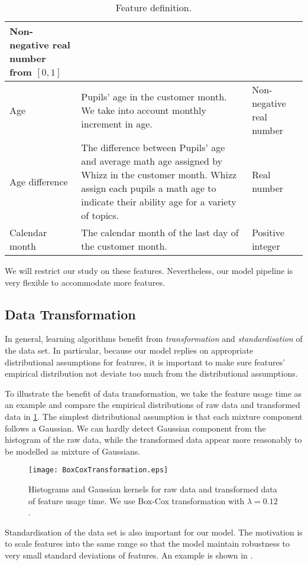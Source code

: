 \begin{table}[!h]
\begin{tabular}{p{3cm}|p{7cm}|p{3.3cm}}
Non-negative real number from $[0,1]$ \\
\hline
Age &
Pupils' age in the customer month. We take into account monthly increment in age.&
Non-negative real number \\
\hline
Age difference &
The difference between Pupils' age and average math age assigned by Whizz in the customer month. Whizz assign each pupils a math age to indicate their ability age for a variety of topics.&
Real number \\
\hline
Calendar month &
The calendar month of the last day of the customer month. &
Positive integer \\
\hline
\end{tabular}
\caption{Feature definition.}
\label{tab:featureDefinition}
\end{table}

We will restrict our study on these features. Nevertheless, our model pipeline is very flexible to accommodate more features. 

\subsection{Data Transformation}

In general, learning algorithms benefit from \textit{transformation} and \textit{standardisation} of the data set. In particular, because our model replies on appropriate distributional assumptions for features, it is important to make sure features' empirical distribution not deviate too much from the distributional assumptions.

To illustrate the benefit of data transformation, we take the feature usage time as an example and compare the empirical distributions of raw data and transformed data in \ref{fig:boxcox}. The simplest distributional assumption is that each mixture component follows a Gaussian. We can hardly detect Gaussian component from the histogram of the raw data, while the transformed data appear more reasonably to be modelled as mixture of Gaussians. 

\begin{figure}[!h]
\centering
\texttt{[image: BoxCoxTransformation.eps]}
\caption{Histograms and Gaussian kernels for raw data and transformed data of feature usage time. We use Box-Cox transformation with $\lambda=0.12$.}
\label{fig:boxcox}
\end{figure}

Standardisation of the data set is also important for our model. The motivation is to scale features into the same range so that the model maintain robustness to very small standard deviations of features. An example is shown in .

